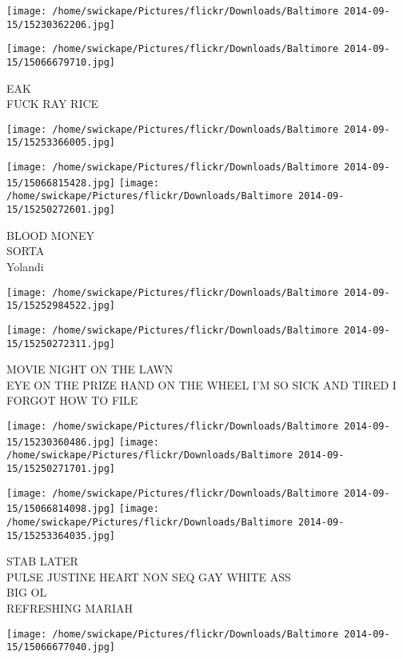\documentclass[10pt,letterpaper]{article}
\begin{document}
\texttt{[image: /home/swickape/Pictures/flickr/Downloads/Baltimore 2014-09-15/15230362206.jpg]}

\vspace{0.25in}
\texttt{[image: /home/swickape/Pictures/flickr/Downloads/Baltimore 2014-09-15/15066679710.jpg]}

EAK\\
FUCK RAY RICE
\pagebreak

\texttt{[image: /home/swickape/Pictures/flickr/Downloads/Baltimore 2014-09-15/15253366005.jpg]}

\vspace{0.25in}
\texttt{[image: /home/swickape/Pictures/flickr/Downloads/Baltimore 2014-09-15/15066815428.jpg]}
\texttt{[image: /home/swickape/Pictures/flickr/Downloads/Baltimore 2014-09-15/15250272601.jpg]}

BLOOD MONEY\\
SORTA\\
Yolandi
\pagebreak

\texttt{[image: /home/swickape/Pictures/flickr/Downloads/Baltimore 2014-09-15/15252984522.jpg]}

\vspace{0.25in}
\texttt{[image: /home/swickape/Pictures/flickr/Downloads/Baltimore 2014-09-15/15250272311.jpg]}

MOVIE NIGHT ON THE LAWN\\
EYE ON THE PRIZE HAND ON THE WHEEL I'M SO SICK AND TIRED I FORGOT HOW TO FILE
\pagebreak

\texttt{[image: /home/swickape/Pictures/flickr/Downloads/Baltimore 2014-09-15/15230360486.jpg]}
\texttt{[image: /home/swickape/Pictures/flickr/Downloads/Baltimore 2014-09-15/15250271701.jpg]}

\texttt{[image: /home/swickape/Pictures/flickr/Downloads/Baltimore 2014-09-15/15066814098.jpg]}
\texttt{[image: /home/swickape/Pictures/flickr/Downloads/Baltimore 2014-09-15/15253364035.jpg]}

STAB LATER\\
PULSE JUSTINE HEART NON SEQ GAY WHITE ASS\\
BIG OL\\
REFRESHING MARIAH
\pagebreak

\texttt{[image: /home/swickape/Pictures/flickr/Downloads/Baltimore 2014-09-15/15066677040.jpg]}
\end{document}
